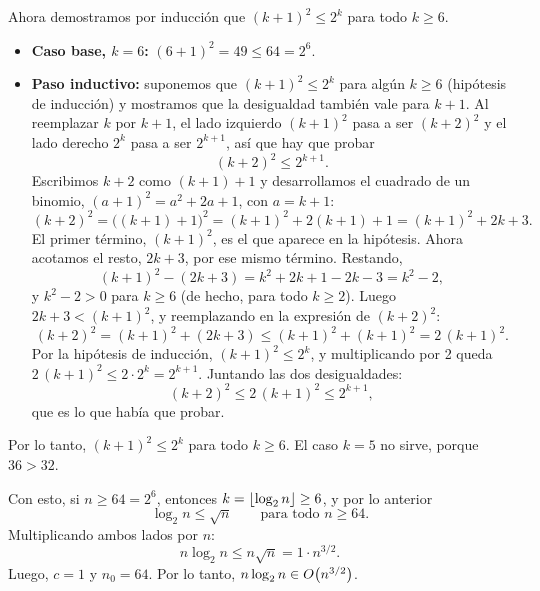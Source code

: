 Ahora demostramos por inducción que $(k+1)^2 \le 2^k$ para todo $k \ge 6$.
\begin{itemize}
  \item \textbf{Caso base, $k = 6$:} $(6 + 1)^2 = 49 \le 64 = 2^6$.
  \item \textbf{Paso inductivo:} suponemos que $(k+1)^2 \le 2^k$ para algún $k \ge 6$
        (hipótesis de inducción) y mostramos que la desigualdad también vale para $k + 1$.
        Al reemplazar $k$ por $k + 1$, el lado izquierdo $(k+1)^2$ pasa a ser $(k+2)^2$ y
        el lado derecho $2^k$ pasa a ser $2^{k+1}$, así que hay que probar
        \[
          (k+2)^2 \le 2^{k+1}.
        \]
        Escribimos $k + 2$ como $(k+1) + 1$ y desarrollamos el cuadrado de un binomio,
        $(a + 1)^2 = a^2 + 2a + 1$, con $a = k + 1$:
        \[
          (k+2)^2 = \big((k+1) + 1\big)^2 = (k+1)^2 + 2(k+1) + 1 = (k+1)^2 + 2k + 3.
        \]
        El primer término, $(k+1)^2$, es el que aparece en la hipótesis. Ahora acotamos
        el resto, $2k + 3$, por ese mismo término. Restando,
        \[
          (k+1)^2 - (2k+3) = k^2 + 2k + 1 - 2k - 3 = k^2 - 2,
        \]
        y $k^2 - 2 > 0$ para $k \ge 6$ (de hecho, para todo $k \ge 2$). Luego
        $2k + 3 < (k+1)^2$, y reemplazando en la expresión de $(k+2)^2$:
        \[
          (k+2)^2 = (k+1)^2 + (2k + 3) \le (k+1)^2 + (k+1)^2 = 2\,(k+1)^2.
        \]
        Por la hipótesis de inducción, $(k+1)^2 \le 2^k$, y multiplicando por 2 queda
        $2\,(k+1)^2 \le 2 \cdot 2^k = 2^{k+1}$. Juntando las dos desigualdades:
        \[
          (k+2)^2 \le 2\,(k+1)^2 \le 2^{k+1},
        \]
        que es lo que había que probar.
\end{itemize}
Por lo tanto, $(k+1)^2 \le 2^k$ para todo $k \ge 6$. El caso $k = 5$ no sirve, porque
$36 > 32$.

Con esto, si $n \ge 64 = 2^6$, entonces $k = \lfloor\log_2 n\rfloor \ge 6$, y por
lo anterior
\[
  \log_2 n \le \sqrt{n} \qquad \text{para todo } n \ge 64.
\]
Multiplicando ambos lados por $n$:
\[
  n \log_2 n \le n \sqrt{n} = 1 \cdot n^{3/2}.
\]
Luego, $c = 1$ y $n_0 = 64$. Por lo tanto, $n \log_2 n \in O\!\left(n^{3/2}\right)$.

